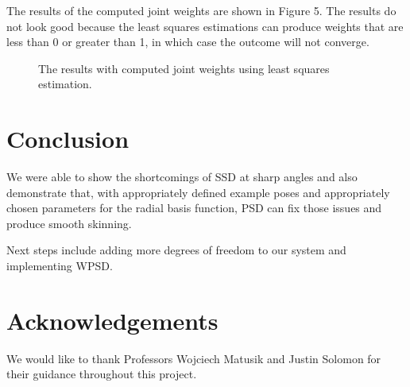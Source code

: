 \documentclass[10pt,twocolumn,letterpaper]{article}
\begin{document}
The results of the computed joint weights are shown in Figure 5. The results do not look good because the least squares estimations can produce weights that are less than 0 or greater than 1, in which case the outcome will not converge.

\begin{figure}[t]
\begin{center}
\end{center}
   \caption{The results with computed joint weights using least squares estimation.}
\label{fig:long}
\label{fig:onecol}
\end{figure}

\section{Conclusion}

We were able to show the shortcomings of SSD at sharp angles and also demonstrate that, with appropriately defined example poses and appropriately chosen parameters for the radial basis function, PSD can fix those issues and produce smooth skinning.

Next steps include adding more degrees of freedom to our system and implementing WPSD.

\section*{Acknowledgements}

We would like to thank Professors Wojciech Matusik and Justin Solomon for their guidance throughout this project.
\end{document}
